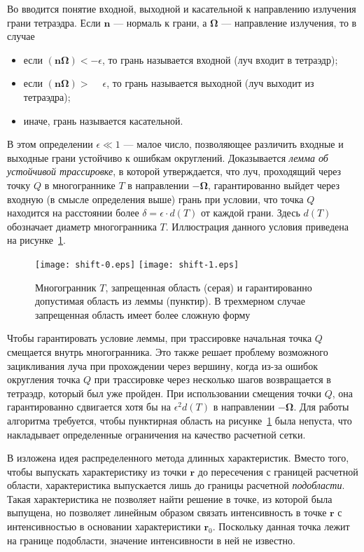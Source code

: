 Во  вводится понятие входной, выходной и касательной к направлению излучения грани тетраэдра. Если $\mathbf n$ --- нормаль к грани, а $\boldsymbol \Omega$ --- направление излучения, то в случае
\begin{itemize}
\item если $(\mathbf n \boldsymbol \Omega) < -\epsilon$, то грань называется входной (луч входит в тетраэдр);
\item если $(\mathbf n \boldsymbol \Omega) > \phantom{-}\epsilon$, то грань называется выходной (луч выходит из тетраэдра);
\item иначе, грань называется касательной.
\end{itemize}
В этом определении $\epsilon \ll 1$ --- малое число, позволяющее различить входные и выходные грани устойчиво к ошибкам округлений. Доказывается 
\emph{лемма об устойчивой трассировке}, в которой утверждается, что луч, проходящий через точку $Q$ в многограннике $T$ в направлении $-\boldsymbol \Omega$, гарантированно выйдет через входную (в смысле определения выше) грань при условии, что точка $Q$ находится на расстоянии более $\delta = \epsilon \cdot d(T)$ от каждой грани. Здесь $d(T)$ обозначает диаметр многогранника $T$. Иллюстрация данного условия приведена на рисунке~\ref{fig:shift}.
\begin{figure}[ht!]
\centering
\texttt{[image: shift-0.eps]}
\texttt{[image: shift-1.eps]}
\caption{Многогранник $T$, запрещенная область (серая) и гарантированно допустимая область из леммы (пунктир). В трехмерном случае запрещенная область имеет более сложную форму}
\label{fig:shift}
\end{figure}

Чтобы гарантировать условие леммы, при трассировке начальная точка $Q$ смещается внутрь многогранника. Это также решает проблему возможного зацикливания луча при прохождении через вершину, когда из-за ошибок округления точка $Q$ при трассировке через несколько шагов возвращается в тетраэдр, который был уже пройден. При использовании смещения точки $Q$, она гарантированно сдвигается хотя бы на $\epsilon^2 d(T)$ в направлении $-\boldsymbol \Omega$. Для работы алгоритма требуется, чтобы пунктирная область на рисунке~\ref{fig:shift} была непуста, что накладывает определенные ограничения на качество расчетной сетки.

В  изложена идея распределенного метода длинных характеристик. Вместо того, чтобы выпускать характеристику из точки $\mathbf r$ до пересечения с границей расчетной области, характеристика выпускается лишь до границы расчетной \emph{подобласти}. Такая характеристика не позволяет найти решение в точке, из которой была выпущена, но позволяет линейным образом связать интенсивность в точке $\mathbf r$ с интенсивностью в основании характеристики $\mathbf r_0$. Поскольку данная точка лежит на границе подобласти, значение интенсивности в ней не известно.

